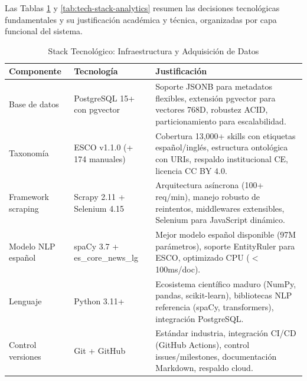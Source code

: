 Las Tablas \ref{tab:tech-stack-infra} y \ref{tab:tech-stack-analytics} resumen las decisiones tecnológicas fundamentales y su justificación académica y técnica, organizadas por capa funcional del sistema.

\begin{table}[H]
\centering
\caption{Stack Tecnológico: Infraestructura y Adquisición de Datos}
\label{tab:tech-stack-infra}
\begin{tabular}{|p{3.5cm}|p{3.5cm}|p{6.5cm}|}
\hline
\textbf{Componente} & \textbf{Tecnología} & \textbf{Justificación} \\
\hline
Base de datos & PostgreSQL 15+ con pgvector & Soporte JSONB para metadatos flexibles, extensión pgvector para vectores 768D, robustez ACID, particionamiento para escalabilidad. \\
\hline
Taxonomía & ESCO v1.1.0 (+ 174 manuales) & Cobertura 13,000+ skills con etiquetas español/inglés, estructura ontológica con URIs, respaldo institucional CE, licencia CC BY 4.0. \\
\hline
Framework scraping & Scrapy 2.11 + Selenium 4.15 & Arquitectura asíncrona (100+ req/min), manejo robusto de reintentos, middlewares extensibles, Selenium para JavaScript dinámico. \\
\hline
Modelo NLP español & spaCy 3.7 + es\_core\_news\_lg & Mejor modelo español disponible (97M parámetros), soporte EntityRuler para ESCO, optimizado CPU ($<$100ms/doc). \\
\hline
Lenguaje & Python 3.11+ & Ecosistema científico maduro (NumPy, pandas, scikit-learn), bibliotecas NLP referencia (spaCy, transformers), integración PostgreSQL. \\
\hline
Control versiones & Git + GitHub & Estándar industria, integración CI/CD (GitHub Actions), control issues/milestones, documentación Markdown, respaldo cloud. \\
\hline
\end{tabular}
\end{table}


